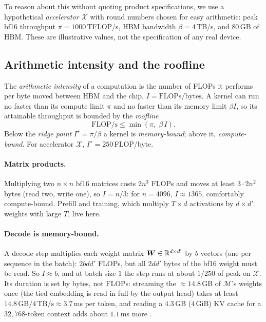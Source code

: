 To reason about this without quoting product specifications, we use a hypothetical
\emph{accelerator $\mathcal{X}$} with round numbers chosen for easy arithmetic: peak bf16
throughput $\pi = 1000$\,TFLOP/s, HBM bandwidth $\beta = 4$\,TB/s, and $80$\,GB of HBM.
These are illustrative values, not the specification of any real device.

\subsection{Arithmetic intensity and the roofline}\label{sec:c01-roofline}

The \emph{arithmetic intensity} of a computation is the number of FLOPs it performs per byte
moved between HBM and the chip, $I = \text{FLOPs}/\text{bytes}$. A kernel can run no faster
than its compute limit $\pi$ and no faster than its memory limit $\beta I$, so its attainable
throughput is bounded by the \emph{roofline} \citep{c01-williams2009roofline}
\begin{equation}\label{eq:c01-roofline}
  \text{FLOP/s} \le \min(\pi,\; \beta\,I).
\end{equation}
Below the \emph{ridge point} $I^\star = \pi/\beta$ a kernel is \emph{memory-bound}; above it,
\emph{compute-bound}. For accelerator $\mathcal{X}$, $I^\star = 250$\,FLOP/byte.

\paragraph{Matrix products.} Multiplying two $n\times n$ bf16 matrices costs $2n^3$ FLOPs and
moves at least $3\cdot 2n^2$ bytes (read two, write one), so $I = n/3$: for $n = 4096$,
$I \approx 1365$, comfortably compute-bound. Prefill and training, which multiply
$T\times d$ activations by $d\times d'$ weights with large $T$, live here.

\paragraph{Decode is memory-bound.} A decode step multiplies each weight matrix
$\bm{W} \in \mathbb{R}^{d\times d'}$ by $b$ vectors (one per sequence in the batch): $2bdd'$ FLOPs, but
all $2dd'$ bytes of the bf16 weight must be read. So $I \approx b$, and at batch size $1$
the step runs at about $1/250$ of peak on $\mathcal{X}$. Its duration is set by bytes, not
FLOPs: streaming the $\approx 14.8$\,GB of $\mathcal{M}$'s weights once (the tied
embedding is read in full by the output head) takes at least
$14.8\,\text{GB} / 4\,\text{TB/s} \approx 3.7$\,ms per token, and reading a $4.3$\,GB
($4$\,GiB) KV cache for a $32{,}768$-token context adds about $1.1$\,ms more
\citep[see also][for a detailed analysis of inference costs]{c01-pope2023inference}.


